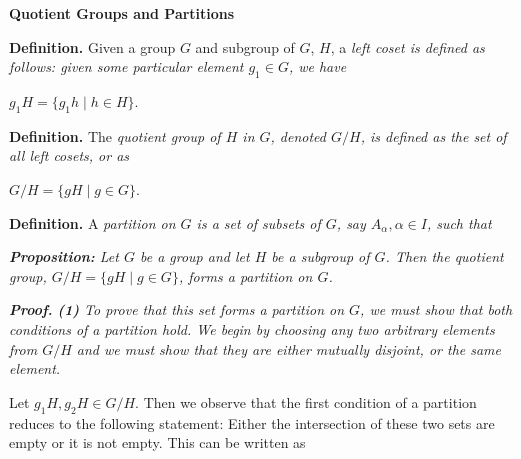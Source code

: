 \documentclass[12pt, a4paper]{article}
\begin{document}
\justifying

\centerline{\Large{\textbf{Quotient Groups and Partitions}}}

\vspace{15mm}

\textbf{Definition.} Given a group $G$ and subgroup of $G$, $H$, a \it left coset \rm is defined as follows: given some particular element $g_1\in G$, we have\hfill

\vspace{6mm}

\centerline{$g_1 H=\{g_1 h\mid h\in H\}$.}\hfill

\vspace{6mm}

\textbf{Definition.} The \it quotient group \rm of $H$ in $G$, denoted $G/H$, is defined as the set of all left cosets, or as\hfill

\vspace{6mm}

\centerline{$G/H=\{gH\mid g\in G\}$.}\hfill

\vspace{6mm}


\textbf{Definition.} A \it partition \rm on $G$ is a set of subsets of $G$, say $A_\alpha, \alpha\in I$, such that\hfill

\vspace{6mm}


\vspace{10mm}

\it \textbf{Proposition:} \rm Let $G$ be a group and let $H$ be a subgroup of $G$. Then the quotient group, $G/H=\{gH\mid g\in G\}$, forms a partition on $G$.

\vspace{10mm}

\it \textbf{Proof.} \rm\textbf{(1)} To prove that this set forms a partition on $G$, we must show that both conditions of a partition hold. We begin by choosing any two arbitrary elements from $G/H$ and we must show that they are either mutually disjoint, or the same element.\hfill

Let $g_1 H, g_2 H\in G/H$. Then we observe that the first condition of a partition reduces to the following statement: Either the intersection of these two sets are empty or it is not empty. This can be written as\hfill
\end{document}
